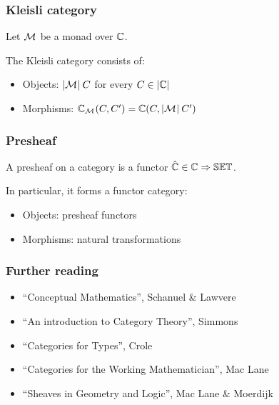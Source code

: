 \documentclass[usenames,dvipsnames,rgb]{beamer}
\begin{document}
\begin{frame}
  \frametitle{Kleisli category}

  Let ${\mathcal{M}}_{}$ be a monad over $\aCategory$.

  \vfill

  The Kleisli category \KleisliCat{\aCategory}{\aMonad} consists of:
  \begin{itemize}
  \item Objects: $| {\mathcal{M}}_{} |\: C$ for every $C \in \CatObj{\aCategory}$
  \item Morphisms: $\CatMorph[\KleisliCat{\aCategory}{\aMonad}]{C}{C'} = \CatMorph[\aCategory]{C}{\FuncObj{\aMonad}\: C'}$
  \end{itemize}

  \vfill

\end{frame}


\newcommand{\Presheaf}[1]{\hat{#1}}

\begin{frame}
  \frametitle{Presheaf}

  A presheaf on a category \aCategory{} is a functor $\Presheaf{\aCategory} \in
  \CatFunc{\aCategory}{\SET}$.

  \bigskip
  
  In particular, it forms a functor category:
  \begin{itemize}
  \item Objects: presheaf functors
  \item Morphisms: natural transformations
  \end{itemize}

\end{frame}



\begin{frame}
  \frametitle{Further reading}

  \begin{itemize}
  \item ``Conceptual Mathematics'', Schanuel \& Lawvere
  \item ``An introduction to Category Theory'', Simmons
  \item ``Categories for Types'', Crole
  \item ``Categories for the Working Mathematician'', Mac Lane
  \item ``Sheaves in Geometry and Logic'', Mac Lane \& Moerdijk
  \end{itemize}
\end{frame}
\end{document}
